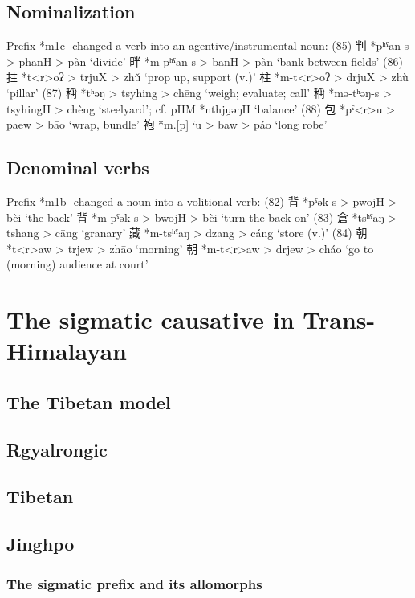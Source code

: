 \documentclass[oneside,a4paper,11pt]{article}
\begin{document}
\subsection{Nominalization}

\citet[55]{bs14oc}

Prefix *m1c- changed a verb into an agentive/instrumental noun:
(85) 判 *pʰˤan-s > phanH > pàn ‘divide’
畔 *m-pʰˤan-s > banH > pàn ‘bank between fields’
(86) 拄 *t<r>oʔ > trjuX > zhǔ ‘prop up, support (v.)’
柱 *m-t<r>oʔ > drjuX > zhù ‘pillar’
(87) 稱 *tʰəŋ > tsyhing > chēng ‘weigh; evaluate; call’
稱 *mə-tʰəŋ-s > tsyhingH > chèng ‘steelyard’; cf. pHM *nthju̯əŋH
‘balance’
(88) 包 *pˤ<r>u > paew > bāo ‘wrap, bundle’
袍 *m.[p] ˤu > baw > páo ‘long robe’


\subsection{Denominal verbs}
\citet[55]{bs14oc}
Prefix *m1b- changed a noun into a volitional verb:
(82) 背 *pˤək-s > pwojH > bèi ‘the back’
背 *m-pˤək-s > bwojH > bèi ‘turn the back on’
(83) 倉 *tsʰˤaŋ > tshang > cāng ‘granary’
藏 *m-tsʰˤaŋ > dzang > cáng ‘store (v.)’
(84) 朝 *t<r>aw > trjew > zhāo ‘morning’
朝 *m-t<r>aw > drjew > cháo ‘go to (morning) audience at court’



\section{The sigmatic causative in Trans-Himalayan}

\subsection{The Tibetan model}

\subsection{Rgyalrongic}
\subsection{Tibetan}
\subsection{Jinghpo}

\subsubsection{The sigmatic prefix and its allomorphs}
\end{document}
